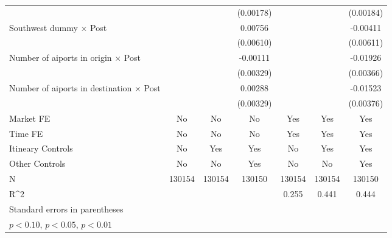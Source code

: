 \begin{table}[htbp]
\begin{tabular}{l*{6}{c}}
                    &                     &                     &   (0.00178)         &                     &                     &   (0.00184)         \\
\addlinespace
Southwest dummy $\times$ Post&                     &                     &     0.00756         &                     &                     &    -0.00411         \\
                    &                     &                     &   (0.00610)         &                     &                     &   (0.00611)         \\
\addlinespace
Number of aiports in origin $\times$ Post&                     &                     &    -0.00111         &                     &                     &    -0.01926\sym{***}\\
                    &                     &                     &   (0.00329)         &                     &                     &   (0.00366)         \\
\addlinespace
Number of aiports in destination $\times$ Post&                     &                     &     0.00288         &                     &                     &    -0.01523\sym{***}\\
                    &                     &                     &   (0.00329)         &                     &                     &   (0.00376)         \\
\midrule
Market FE           &          No         &          No         &          No         &         Yes         &         Yes         &         Yes         \\
Time FE             &          No         &          No         &          No         &         Yes         &         Yes         &         Yes         \\
Itineary Controls   &          No         &         Yes         &         Yes         &          No         &         Yes         &         Yes         \\
Other Controls      &          No         &          No         &         Yes         &          No         &          No         &         Yes         \\
N                   &      130154         &      130154         &      130150         &      130154         &      130154         &      130150         \\
R^2                 &                     &                     &                     &       0.255         &       0.441         &       0.444         \\
\bottomrule
\multicolumn{7}{l}{\footnotesize Standard errors in parentheses}\\
\multicolumn{7}{l}{\footnotesize \sym{*} \(p<0.10\), \sym{**} \(p<0.05\), \sym{***} \(p<0.01\)}\\
\end{tabular}
\end{table}
